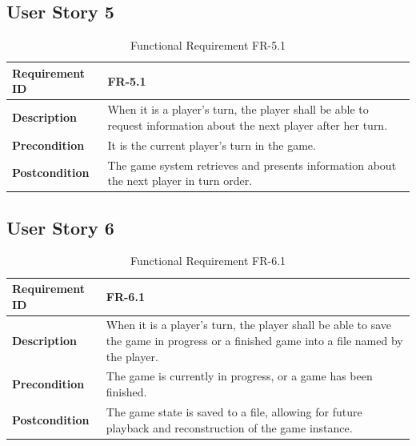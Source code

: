 \documentclass{article}
\begin{document}
\clearpage
\subsection{User Story 5}

\begin{table}[ht]
    \centering
    \caption{Functional Requirement FR-5.1}
    \begin{tabular}{@{}P{3cm}P{12cm}@{}}
        \toprule
        \textbf{Requirement ID} & FR-5.1 \\ \midrule
        \textbf{Description} & When it is a player’s turn, the player shall be able to request information about the next player after her turn. \\ \midrule
        \textbf{Precondition} & It is the current player’s turn in the game. \\ \midrule
        \textbf{Postcondition} & The game system retrieves and presents information about the next player in turn order. \\ \bottomrule
    \end{tabular}
\end{table}

\clearpage
\subsection{User Story 6}
\begin{table}[ht]
    \centering
    \caption{Functional Requirement FR-6.1}
    \begin{tabular}{@{}P{3cm}P{12cm}@{}}
        \toprule
        \textbf{Requirement ID} & FR-6.1 \\ \midrule
        \textbf{Description} & When it is a player’s turn, the player shall be able to save the game in progress or a finished game into a file named by the player. \\ \midrule
        \textbf{Precondition} & The game is currently in progress, or a game has been finished. \\ \midrule
        \textbf{Postcondition} & The game state is saved to a file, allowing for future playback and reconstruction of the game instance. \\ \bottomrule
    \end{tabular}
\end{table}
\end{document}
